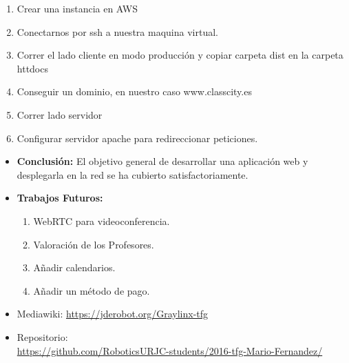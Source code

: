 \documentclass[notes,slidesec,a4]{seminar}
\begin{document}

\begin{hslide}
\begin{enumerate}
\item Crear una instancia en AWS
\item Conectarnos por ssh a nuestra maquina virtual.
\item Correr el lado cliente en modo producción y copiar carpeta dist en la carpeta httdocs
\item Conseguir un dominio, en nuestro caso www.classcity.es
\item Correr lado servidor
\item Configurar servidor apache para redireccionar peticiones.
\end{enumerate}
\end{hslide}



\begin{hslide}
\begin{itemize}
\item \textbf{Conclusión: } El objetivo general de desarrollar una aplicación web y desplegarla en la red se ha cubierto satisfactoriamente.
\item \textbf{Trabajos Futuros: }
\begin{enumerate}
\item WebRTC para videoconferencia.
\item Valoración de los Profesores.
\item Añadir calendarios.
\item Añadir un método de pago.
\end{enumerate}
\end{itemize}
\end{hslide}


\begin{hslide}
\begin{itemize}
\item Mediawiki: \url{https://jderobot.org/Graylinx-tfg}
\item Repositorio:\\ \url{https://github.com/RoboticsURJC-students/2016-tfg-Mario-Fernandez/}
\end{itemize}
\end{hslide}
\end{document}
